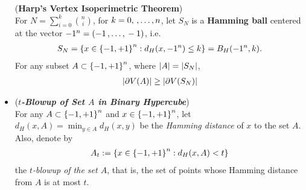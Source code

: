 \documentclass[11pt]{article}
\begin{document}
\begin{itemize}
\begin{theorem} (\textbf{Harp's Vertex Isoperimetric Theorem}) \citep{boucheron2013concentration}\\
For $N = \sum_{i=0}^{k}{n \choose i}$, for $k=0, \,{,}\ldots{,}\, n$, %
let $S_N$ is a \textbf{Hamming ball} centered at the vector $-1^n= (-1 \,{,}\ldots{,}\, -1)$, i.e.
\begin{align*}
S_N = \left\{x \in \left\{-1, +1\right\}^n:  d_{H}(x, -1^n) \le k\right\} = B_{H}(-1^n, k).
\end{align*} 
For any subset $A \subset \left\{-1, +1\right\}^n$, where $\left\lvert A \right\rvert = \left\lvert S_N \right\rvert$, 
\begin{align*}
\left\lvert \partial V(A) \right\rvert \ge \left\lvert \partial V(S_N) \right\rvert 
\end{align*}
\end{theorem}


\item \begin{definition} (\textbf{\emph{$t$-Blowup of Set $A$ in Binary Hypercube}}) \\
For any $A \subset \left\{-1, +1\right\}^n$ and $x \in \left\{-1, +1\right\}^n$, let $d_{H}(x, A) = \min_{y \in A} d_{H}(x, y)$ be the \emph{Hamming distance} of $x$ to the set $A$. Also, denote by
\begin{align*}
A_t := \left\{x \in \left\{-1, +1\right\}^n: d_{H}(x, A) < t\right\}
\end{align*} the \emph{$t$-blowup of the set $A$}, that is, the set of points whose Hamming distance from $A$ is at most $t$.
\end{definition}


\end{itemize}
\end{document}
